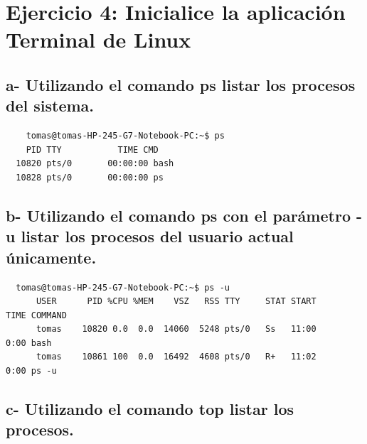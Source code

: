 \documentclass{article}
\begin{document}
\section*{Ejercicio 4: Inicialice la aplicación Terminal de Linux}


\subsection*{a- Utilizando el comando ps listar los procesos del sistema.}

\begin{commandline}
	\begin{verbatim}
	tomas@tomas-HP-245-G7-Notebook-PC:~$ ps
    PID TTY           TIME CMD
  10820 pts/0       00:00:00 bash
  10828 pts/0       00:00:00 ps
	\end{verbatim}
\end{commandline}

\subsection*{b- Utilizando el comando ps con el parámetro -u listar los procesos del usuario actual únicamente.}

\begin{commandline}
  \begin{verbatim}
  tomas@tomas-HP-245-G7-Notebook-PC:~$ ps -u
      USER      PID %CPU %MEM    VSZ   RSS TTY     STAT START      TIME COMMAND
      tomas    10820 0.0  0.0  14060  5248 pts/0   Ss   11:00      0:00 bash
      tomas    10861 100  0.0  16492  4608 pts/0   R+   11:02      0:00 ps -u
  \end{verbatim}
\end{commandline}


\subsection*{c- Utilizando el comando top listar los procesos.}
\end{document}
